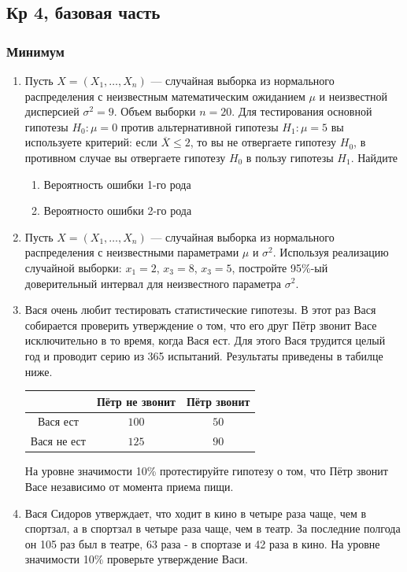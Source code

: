 \subsection{Кр 4, базовая часть}

\subsubsection{Минимум}

\begin{enumerate}


	\item Пусть $X=(X_{1}, \ldots,X_{n})$ — случайная выборка из нормального распределения с неизвестным математическим ожиданием $\mu$ и неизвестной дисперсией $\sigma^2=9$. Объем выборки $n=20$. Для тестирования основной гипотезы $H_{0}:\mu=0$ против альтернативной гипотезы $H_{1}:\mu=5$ вы используете критерий: если $\overline{X}\leq2$, то вы не отвергаете гипотезу $H_{0}$, в противном случае вы отвергаете гипотезу $H_{0}$ в пользу гипотезы $H_{1}$. Найдите
	\begin{enumerate}
	\item Вероятность ошибки 1-го рода
	\item Вероятносто ошибки 2-го рода
	\end{enumerate}


		\item Пусть $X=(X_{1}, \ldots,X_{n})$ — случайная выборка из нормального распределения с неизвестными параметрами $\mu$ и $\sigma^2$. Используя реализацию случайной выборки: $x_{1}=2$, $x_{3}=8$, $x_{3}=5$, постройте 95\%-ый доверительный интервал для неизвестного параметра $\sigma^2$.


	\item Вася очень любит тестировать статистические гипотезы. В этот раз Вася собирается проверить утверждение о том, что его друг Пётр звонит Васе исключительно в то время, когда Вася ест. Для этого Вася трудится целый год и проводит серию из 365 испытаний. Результаты приведены в табилце ниже.

	\begin{center}
		\begin{tabular}{c|cc}
			\toprule
			& Пётр не звонит & Пётр звонит\\
			\midrule
			Вася ест & $100$ & $50$\\
			Вася не ест  & $125$ & $90$\\
			\bottomrule
		\end{tabular}
	\end{center}

	На уровне значимости 10\% протестируйте гипотезу о том, что Пётр звонит Васе независимо от момента приема пищи.


\item Вася Сидоров утверждает, что ходит в кино в четыре раза чаще, чем в спортзал, а в спортзал в четыре раза чаще, чем в театр. За последние полгода он 105 раз был в театре, 63 раза - в спортазе и 42 раза в кино. На уровне значимости 10\% проверьте утверждение Васи.

\end{enumerate}


